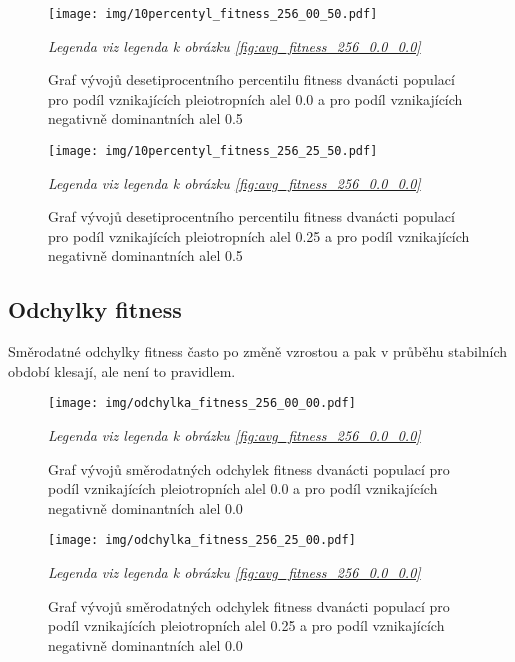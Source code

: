 \begin{figure}[H]
\caption{Graf vývojů desetiprocentního percentilu fitness dvanácti populací pro podíl vznikajících pleiotropních alel 0.0 a pro podíl
    vznikajících negativně dominantních alel 0.5}
\centering
\texttt{[image: img/10percentyl\_fitness\_256\_00\_50.pdf]}

\label{fig:10percentyl_fitness_256_0.0_0.5}

\textit{Legenda viz legenda k obrázku \ref{fig:avg_fitness_256_0.0_0.0}}

\end{figure}

\begin{figure}[H]
\caption{Graf vývojů desetiprocentního percentilu fitness dvanácti populací pro podíl vznikajících pleiotropních alel 0.25 a pro podíl
    vznikajících negativně dominantních alel 0.5}
\centering
\texttt{[image: img/10percentyl\_fitness\_256\_25\_50.pdf]}

\label{fig:10percentyl_fitness_256_0.25_0.5}

\textit{Legenda viz legenda k obrázku \ref{fig:avg_fitness_256_0.0_0.0}}

\end{figure}

\subsection{Odchylky fitness }

Směrodatné odchylky fitness často po změně vzrostou a pak v průběhu stabilních období klesají, ale není to pravidlem.

\begin{figure}[H]
\caption{Graf vývojů směrodatných odchylek fitness dvanácti populací pro podíl vznikajících pleiotropních alel 0.0 a pro podíl
         vznikajících negativně dominantních alel 0.0}
\centering
\texttt{[image: img/odchylka\_fitness\_256\_00\_00.pdf]}

\label{fig:odchylka_fitness_256_0.0_0.0}

\textit{Legenda viz legenda k obrázku \ref{fig:avg_fitness_256_0.0_0.0}}

\end{figure}


\begin{figure}[H]
\caption{Graf vývojů směrodatných odchylek fitness dvanácti populací pro podíl vznikajících pleiotropních alel 0.25 a pro podíl
        vznikajících negativně dominantních alel 0.0}
\centering
\texttt{[image: img/odchylka\_fitness\_256\_25\_00.pdf]}

\label{fig:odchylka_fitness_256_0.25_0.0}

\textit{Legenda viz legenda k obrázku \ref{fig:avg_fitness_256_0.0_0.0}}

\end{figure}

